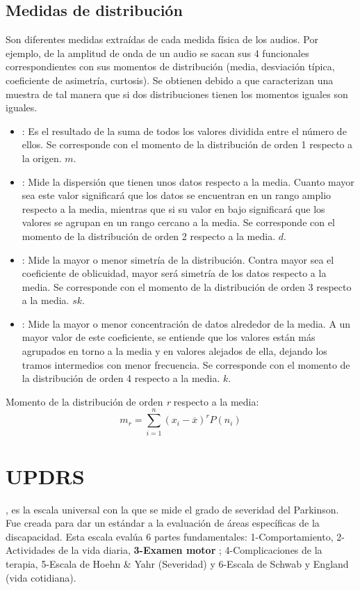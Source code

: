 \subsection{Medidas de distribución}\label{subsec:medidasdistribucion}
Son diferentes medidas extraídas de cada medida física de los audios. Por ejemplo, de la amplitud de onda de un audio se sacan sus 4 funcionales correspondientes con sus momentos de distribución (media, desviación típica, coeficiente de asimetría, curtosis). Se obtienen debido a que caracterizan una muestra de tal manera que si dos distribuciones tienen los momentos iguales son iguales.
\begin{itemize}
	\item {}: Es el resultado de la suma de todos los valores dividida entre el número de ellos. Se corresponde con el momento de la distribución de orden 1 respecto a la origen. $m$.
	\item {}: Mide la dispersión que tienen unos datos respecto a la media. Cuanto mayor sea este valor significará que los datos se encuentran en un rango amplio respecto a la media, mientras que si su valor en bajo significará que los valores se agrupan en un rango cercano a la media. Se corresponde con el momento de la distribución de orden 2 respecto a la media. $d$.
	\item {}: Mide la mayor o menor simetría de la distribución. Contra mayor sea el coeficiente de oblicuidad, mayor será simetría de los datos respecto a la media. Se corresponde con el momento de la distribución de orden 3 respecto a la media. $sk$. 
	\item {}: Mide la mayor o menor concentración de datos alrededor de la media. A un mayor valor de este coeficiente, se entiende que los valores están más agrupados en torno a la media y en valores alejados de ella, dejando los tramos intermedios con menor frecuencia. Se corresponde con el momento de la distribución de orden 4 respecto a la media. $k$.
\end{itemize}
Momento de la distribución de orden \textit{r} respecto a la media:\\
\begin{equation}
m_{r} = \sum_{i=1}^{n} (x_{i} - \overline{x})^{r} P(n_{i})
\end{equation}

\section{UPDRS}\label{sec:Updrs}
 \cite{updrs},  es la escala universal con la que se mide el grado de severidad del Parkinson. Fue creada para dar un estándar a la evaluación de áreas específicas de la discapacidad. Esta escala evalúa 6 partes fundamentales: 1-Comportamiento, 2-Actividades de la vida diaria, \textbf{3-Examen motor} \cite{updrs3}; 4-Complicaciones de la terapia, 5-Escala de Hoehn \& Yahr (Severidad) \cite{hoehn1967} y 6-Escala de Schwab y England (vida cotidiana).\\
